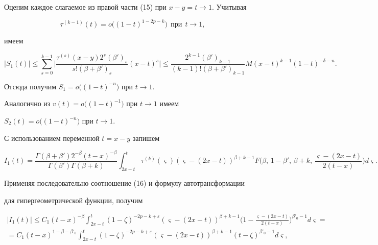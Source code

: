 Оценим каждое слагаемое из правой части (15) при $x-y=t\to1$. Учитывая 


\begin{equation} 


\tau^{(k-1)}(t)=o\big((1-t)^{1-2p-k}\big)\ \ 


\text{при} \ \ t\to1, 


\end{equation} 


имеем 


$$ 


|S_1(t)|\le\sum^{k-1}_{s=0}\bigg| 


\frac{\tau^{(s)}(x-y)2^s(\beta')_s} 


{s!(\beta+\beta')_s}(x-t)^s\bigg|\le 


\frac{2^{k-1}(\beta')_{k-1}}{(k-1)!(\beta+\beta')_{k-1}} 


M(x-t)^{k-1}(1-t)^{-\delta-n}. 


$$ 


Отсюда получим $S_1=o\big((1-t)^{-n}\big)$ при $t\to1$. 


 


Аналогично из $v(t)=o\big((1-t)^{-1}\big)$ при $t\to1$ имеем 


$S_2(t)=o\big((1-t)^{-n}\big)$ при $t\to1$. 


 


С использованием переменной $t=x-y$ запишем 


$$ 


I_1(t)=\frac{\Gamma(\beta+\beta')2^{-\beta}(t-x)^{-\beta}} 


{\Gamma(\beta')\Gamma(\beta+k)}\int^t_{2x-t}\tau^{(k)} 


(\varsigma)(\varsigma-(2x-t))^{\beta+k-1}F\bigg(\beta,\,1-\beta', 


\,\beta+k,\,\frac{\varsigma-(2x-t)}{2(t-x)}\bigg)d\varsigma. 


$$ 


 


Применяя последовательно соотношение (16) и формулу автотрансформации 


для гипергеометрической функции, получим 


\begin{multline*} 


|I_1(t)|\le C_1(t-x)^{-\beta}\int^t_{2x-t}(1-\zeta)^{-2p-k+\varepsilon} 


(\varsigma-(2x-t))^{\beta+k-1}\bigg(1-\frac{\varsigma-(2x-t)}{2(t-x)} 


\bigg)^{\beta'_0-1}d\varsigma=\\ 


% 


=C_1(t-x)^{1-\beta-\beta'_0}\int^t_{2x-t}(1-\zeta)^{-2p-k+\varepsilon} 


(\varsigma-(2x-t))^{\beta+k-1}(t-\zeta)^{\beta'_0-1}d\varsigma, 


\end{multline*} 


